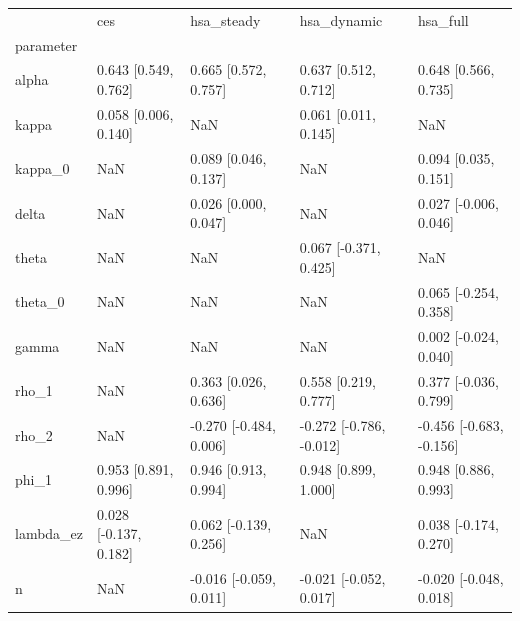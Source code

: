 \begin{tabular}{lllll}
\toprule
 & ces & hsa\_steady & hsa\_dynamic & hsa\_full \\
parameter &  &  &  &  \\
\midrule
alpha & 0.643 [0.549, 0.762] & 0.665 [0.572, 0.757] & 0.637 [0.512, 0.712] & 0.648 [0.566, 0.735] \\
kappa & 0.058 [0.006, 0.140] & NaN & 0.061 [0.011, 0.145] & NaN \\
kappa\_0 & NaN & 0.089 [0.046, 0.137] & NaN & 0.094 [0.035, 0.151] \\
delta & NaN & 0.026 [0.000, 0.047] & NaN & 0.027 [-0.006, 0.046] \\
theta & NaN & NaN & 0.067 [-0.371, 0.425] & NaN \\
theta\_0 & NaN & NaN & NaN & 0.065 [-0.254, 0.358] \\
gamma & NaN & NaN & NaN & 0.002 [-0.024, 0.040] \\
rho\_1 & NaN & 0.363 [0.026, 0.636] & 0.558 [0.219, 0.777] & 0.377 [-0.036, 0.799] \\
rho\_2 & NaN & -0.270 [-0.484, 0.006] & -0.272 [-0.786, -0.012] & -0.456 [-0.683, -0.156] \\
phi\_1 & 0.953 [0.891, 0.996] & 0.946 [0.913, 0.994] & 0.948 [0.899, 1.000] & 0.948 [0.886, 0.993] \\
lambda\_ez & 0.028 [-0.137, 0.182] & 0.062 [-0.139, 0.256] & NaN & 0.038 [-0.174, 0.270] \\
n & NaN & -0.016 [-0.059, 0.011] & -0.021 [-0.052, 0.017] & -0.020 [-0.048, 0.018] \\
\bottomrule
\end{tabular}
